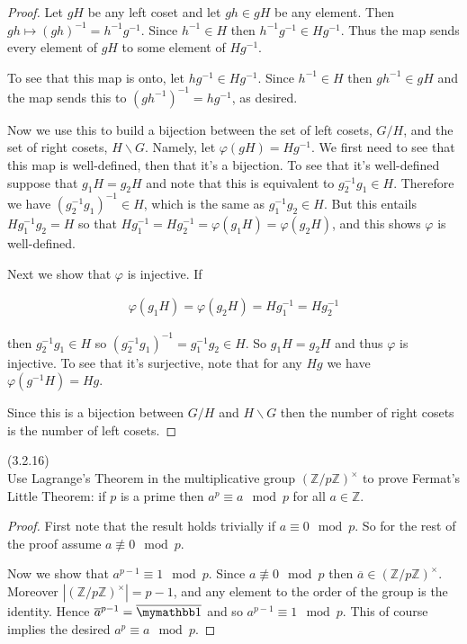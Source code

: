 \documentclass{exam}
\begin{document}
\begin{questions}
\begin{proof}
  Let $gH$ be any left coset and let $gh\in gH$ be any element.  Then $gh\mapsto (gh)^{-1} = h^{-1}g^{-1}$.  Since $h^{-1}\in H$ then $h^{-1}g^{-1}\in Hg^{-1}$.  Thus the map sends every element of $gH$ to some element of $Hg^{-1}$.

  To see that this map is onto, let $hg^{-1}\in Hg^{-1}$.  Since $h^{-1}\in H$ then $gh^{-1}\in gH$ and the map sends this to $(gh^{-1})^{-1}=hg^{-1}$, as desired.

  \vspace{1cm}

  Now we use this to build a bijection between the set of left cosets, $G/H$, and the set of right cosets, $H\backslash G$.  Namely, let $\varphi(gH)=Hg^{-1}$.  We first need to see that this map is well-defined, then that it's a bijection.  To see that it's well-defined suppose that $g_1H = g_2H$ and note that this is equivalent to $g_2^{-1}g_1\in H$.  Therefore we have $(g_2^{-1}g_1)^{-1}\in H$, which is the same as $g_1^{-1}g_2\in H$.  But this entails $Hg_1^{-1}g_2 = H$ so that $Hg_1^{-1}=Hg_2^{-1}=\varphi(g_1H)=\varphi(g_2H)$, and this shows $\varphi$ is well-defined.

  Next we show that $\varphi$ is injective.  If

  \begin{align*}
    \varphi(g_1H) = \varphi(g_2H) = Hg_1^{-1} = Hg_2^{-1}
  \end{align*}

  then $g_2^{-1}g_1\in H$ so $(g_2^{-1}g_1)^{-1}=g_1^{-1}g_2\in H$.  So $g_1H=g_2H$ and thus $\varphi$ is injective.  To see that it's surjective, note that for any $Hg$ we have $\varphi(g^{-1}H)=Hg$.

  Since this is a bijection between $G/H$ and $H\backslash G$ then the number of right cosets is the number of left cosets.
\end{proof}

\question(3.2.16)\\ Use Lagrange's Theorem in the multiplicative group $(\mathbb Z/p\mathbb Z)^\times$ to prove Fermat's Little Theorem: if $p$ is a prime then $a^p\equiv a \mod p$ for all $a\in \mathbb Z$.

\begin{proof}
  First note that the result holds trivially if $a\equiv 0\mod p$.  So for the rest of the proof assume $a\not\equiv 0\mod p$.

  Now we show that $a^{p-1}\equiv 1\mod p$.  Since $a\not\equiv 0\mod p$ then $\overline a\in (\mathbb Z/p\mathbb Z)^\times$.  Moreover $|(\mathbb Z/p\mathbb Z)^\times|=p-1$, and any element to the order of the group is the identity.  Hence $\overline a^{p-1}=\overline {\mymathbb 1}$ and so $a^{p-1}\equiv 1\mod p$.  This of course implies the desired $a^p\equiv a\mod p$.
\end{proof}


\end{questions}
\end{document}
